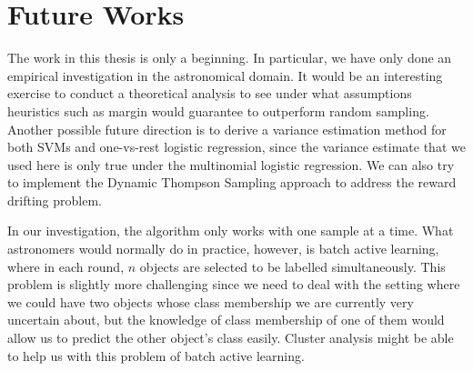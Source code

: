 \section{Future Works}
\label{sec:future}

The work in this thesis is only a beginning. In particular, we have only done an empirical
investigation in the astronomical domain. It would be an interesting exercise to conduct a
theoretical analysis to see under what assumptions heuristics such as margin would guarantee to
outperform random sampling. Another possible future direction is to derive a variance estimation
method for both SVMs and one-vs-rest logistic regression, since the variance estimate that we used here
is only true under the multinomial logistic regression. We can also try to implement the Dynamic
Thompson Sampling approach to address the reward drifting problem.

In our investigation, the algorithm only works with one sample at a time. What astronomers would
normally do in practice, however, is batch active learning, where in each round, $n$ objects are
selected to be labelled simultaneously. This problem is slightly more challenging since we need to
deal with the setting where we could have two objects whose class membership we are currently very
uncertain about, but the knowledge of class membership of one of them would allow us to predict the
other object's class easily. Cluster analysis might be able to help us with this problem of batch
active learning.

